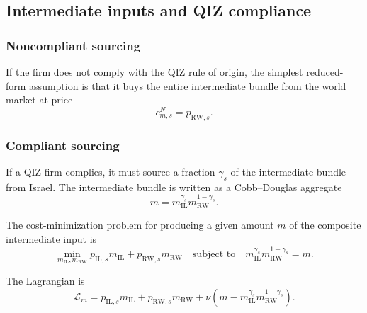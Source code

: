 \documentclass[11pt]{article}
\begin{document}
\subsection{Intermediate inputs and QIZ compliance}

\subsubsection{Noncompliant sourcing}

If the firm does not comply with the QIZ rule of origin, the simplest reduced-form assumption is that it buys the entire intermediate bundle from the world market at price
\begin{equation}
c^N_{m,s}=p_{\mathrm{RW},s}.
\label{eq:cm_noncompliant}
\end{equation}

\subsubsection{Compliant sourcing}

If a QIZ firm complies, it must source a fraction \(\gamma_s\) of the intermediate bundle from Israel. The intermediate bundle is written as a Cobb--Douglas aggregate
\begin{equation}
m = m_{\mathrm{IL}}^{\gamma_s}m_{\mathrm{RW}}^{1-\gamma_s}.
\label{eq:bundle_final}
\end{equation}

The cost-minimization problem for producing a given amount \(m\) of the composite intermediate input is
\begin{equation}
\min_{m_{\mathrm{IL}},m_{\mathrm{RW}}} p_{\mathrm{IL},s}m_{\mathrm{IL}}+p_{\mathrm{RW},s}m_{\mathrm{RW}}
\quad\text{subject to}\quad
m_{\mathrm{IL}}^{\gamma_s}m_{\mathrm{RW}}^{1-\gamma_s}=m.
\end{equation}

The Lagrangian is
\begin{equation}
\mathcal{L}_m = p_{\mathrm{IL},s}m_{\mathrm{IL}}+p_{\mathrm{RW},s}m_{\mathrm{RW}}+\nu\left(m-m_{\mathrm{IL}}^{\gamma_s}m_{\mathrm{RW}}^{1-\gamma_s}\right).
\end{equation}
\end{document}
